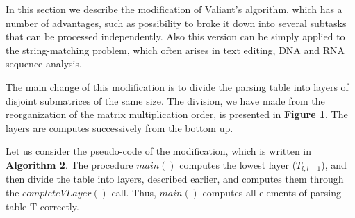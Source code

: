 \documentclass[runningheads]{llncs}
\begin{document}
In this section we describe the modification of Valiant's algorithm, which has a number of advantages, such as possibility to broke it down into several subtasks that can be processed independently. Also this version can be simply applied to the string-matching problem, which often arises in text editing, DNA and RNA sequence analysis.
 
The main change of this modification is to divide the parsing table into layers of disjoint submatrices of the same size.
The division, we have made from the reorganization of the matrix multiplication order, is presented in \textbf{Figure 1}. 
The layers are computes successively from the bottom up.

Let us consider the pseudo-code of the modification, which is written in \textbf{Algorithm 2}. The procedure $main()$ computes the lowest layer ($T_{l, l+1}$), and then divide the table into layers, described earlier, and computes them through the $completeVLayer()$ call. Thus, $main()$ computes all elements of parsing table T correctly.
\end{document}
